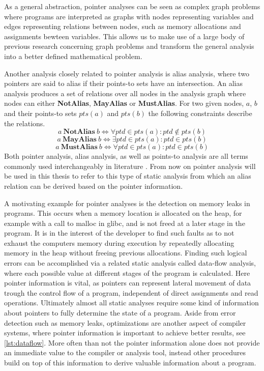 As a general abstraction, pointer analyses can be seen as complex graph problems where programs are interpreted as graphs with nodes representing variables and edges representing relations between nodes, such as memory allocations and assignments bewteen variables.
This allows us to make use of a large body of previous research concerning graph problems and transform the general analysis into a better defined mathematical problem.

Another analysis closely related to pointer analysis is alias analysis, where two pointers are said to alias if their points-to sets have an intersection. An alias analysis produces a set of relations over all nodes in the analysis graph where nodes can either \textbf{NotAlias}, \textbf{MayAlias} or \textbf{MustAlias}.
For two given nodes, $a$, $b$ and their points-to sets $pts(a)$ and $pts(b)$ the following constraints describe the relations.
$$a\ \textbf{NotAlias}\ b \iff \forall ptd \in pts(a) \colon ptd \notin pts(b)$$
$$a\ \textbf{MayAlias}\ b \iff \exists ptd \in pts(a) \colon ptd \in pts(b)$$
$$a\ \textbf{MustAlias}\ b \iff \forall ptd \in pts(a) \colon ptd \in pts(b)$$
Both pointer analysis, alias analysis, as well as points-to analysis are all terms commonly used interchangeably in literature \cite{hind2001pointer}. From now on pointer analysis will be used in this thesis to refer to this type of static analysis from which an alias relation can be derived based on the pointer information.

A motivating example for pointer analyses is the detection on memory leaks in programs.
This occurs when a memory location is allocated on the heap, for example with a call to malloc in glibc, and is not freed at a later stage in the program.
It is in the interest of the developer to find such faults as to not exhaust the computers memory during execution by repeatedly allocating memory in the heap without freeing previous allocations.
Finding such logical errors can be accomplished via a related static analysis called data-flow analysis, where each possible value at different stages of the program is calculated. Here pointer information is vital, as pointers can represent lateral movement of data trough the control flow of a program, independent of direct assignments and read operations. Ultimately almost all static analyses require some kind of information about pointers to fully determine the state of a program.
Aside from error detection such as memory leaks, optimizations are another aspect of compiler systems, where pointer information is important to achieve better results, see \autoref{lst:dataflow}.
More often than not the pointer information alone does not provide an immediate value to the compiler or analysis tool, instead other procedures build on top of this information to derive valuable information about a program.

